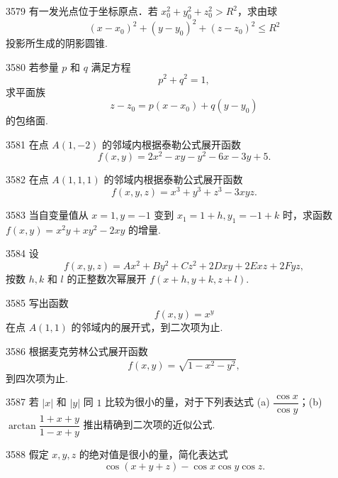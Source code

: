 \begin{prob}[M]{3579}
有一发光点位于坐标原点．若 $x_0^2 + y_0^2 + z_0^2 > R^2$，求由球
\[
(x - x_0)^2 + (y - y_0)^2 + (z - z_0)^2 \leqslant R^2
\]
投影所生成的阴影圆锥.
\end{prob}

\begin{prob}[M]{3580}
若参量 $p$ 和 $q$ 满足方程
\[
p^2 + q^2 = 1,
\]
求平面族
\[
z - z_0 = p(x - x_0) + q(y - y_0)
\]
的包络面.
\end{prob}


\begin{prob}[M]{3581}
在点 $A(1, -2)$ 的邻域内根据泰勒公式展开函数
\[
f(x, y) = 2x^2 - xy - y^2 - 6x - 3y + 5.
\]
\end{prob}

\begin{prob}[M]{3582}
在点 $A(1, 1, 1)$ 的邻域内根据泰勒公式展开函数
\[
f(x, y, z) = x^3 + y^3 + z^3 - 3xyz.
\]
\end{prob}

\begin{prob}[M]{3583}
当自变量值从 $x = 1, y = -1$ 变到 $x_1 = 1 + h, y_1 = -1 + k$ 时，求函数 $f(x, y) = x^2 y + xy^2 - 2xy$ 的增量.
\end{prob}

\begin{prob}[M]{3584}
设
\[
f(x, y, z) = Ax^2 + By^2 + Cz^2 + 2Dxy + 2Exz + 2Fyz,
\]
按数 $h, k$ 和 $l$ 的正整数次幂展开 $f(x + h, y + k, z + l)$.
\end{prob}

\begin{prob}[M]{3585}
写出函数
\[
f(x, y) = x^y
\]
在点 $A(1, 1)$ 的邻域内的展开式，到二次项为止.
\end{prob}

\begin{prob}[M]{3586}
根据麦克劳林公式展开函数
\[
f(x, y) = \sqrt{1 - x^2 - y^2},
\]
到四次项为止.
\end{prob}

\begin{prob}[M]{3587}
若 $|x|$ 和 $|y|$ 同 $1$ 比较为很小的量，对于下列表达式
(a) $\dfrac{\cos x}{\cos y}$；\qquad (b) $\arctan\dfrac{1 + x + y}{1 - x + y}$
推出精确到二次项的近似公式.
\end{prob}

\begin{prob}[M]{3588}
假定 $x, y, z$ 的绝对值是很小的量，简化表达式
\[
\cos(x + y + z) - \cos x \cos y \cos z.
\]
\end{prob}

